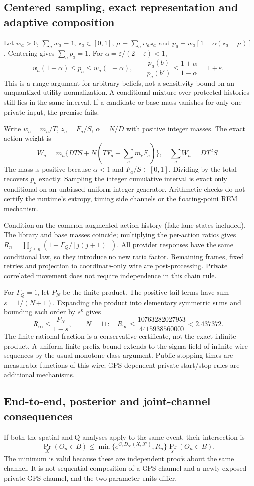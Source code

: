 \subsection{Centered sampling, exact representation and adaptive composition}
Let $w_a>0$, $\sum_aw_a=1$, $z_a\in[0,1]$, $\mu=\sum_aw_az_a$ and
$p_a=w_a[1+\alpha(z_a-\mu)]$. Centering gives
$\sum_ap_a=1$. For $\alpha=\varepsilon/(2+\varepsilon)<1$,
\[
w_a(1-\alpha)\le p_a\le w_a(1+\alpha),\qquad
\frac{p_a(b)}{p_a(b')}\le\frac{1+\alpha}{1-\alpha}=1+\varepsilon .
\]
This is a range argument for arbitrary beliefs, not a sensitivity bound on an
unquantized utility normalization. A conditional mixture over protected histories
still lies in the same interval. If a candidate or base mass vanishes for only
one private input, the premise fails.

Write $w_a=m_a/T$, $z_a=F_a/S$, $\alpha=N/D$ with positive integer masses.
The exact action weight is
\[
W_a=m_a\{DTS+N(TF_a-\sum_cm_cF_c)\},\quad
\sum_aW_a=DT^2S .
\]
The mass is positive because $\alpha<1$ and $F_a/S\in[0,1]$.
Dividing by the total recovers $p_a$ exactly. Sampling the integer cumulative
interval is exact only conditional on an unbiased uniform integer generator.
Arithmetic checks do not certify the runtime's entropy, timing side channels
or the floating-point REM mechanism.

Condition on the common augmented action history (fake lane states included).
The library and base masses coincide; multiplying the per-action ratios gives
$R_n=\prod_{j\le n}(1+\Gamma_Q/[j(j+1)])$. All provider responses have the same
conditional law, so they introduce no new ratio factor. Remaining frames,
fixed retries and projection to coordinate-only wire are post-processing.
Private correlated movement does not require independence in this chain rule.

For $\Gamma_Q=1$, let $P_N$ be the finite product. The positive tail terms
have sum $s=1/(N+1)$. Expanding the product into elementary symmetric sums
and bounding each order by $s^k$ gives
\[
R_\infty\le\frac{P_N}{1-s},\qquad
N=11:\quad R_\infty\le
\frac{10763282027953}{4415938560000}<2.437372.
\]
The finite rational fraction is a conservative certificate, not the exact
infinite product. A uniform finite-prefix bound extends to the sigma-field
of infinite wire sequences by the usual monotone-class argument. Public
stopping times are measurable functions of this wire; GPS-dependent private
start/stop rules are additional mechanisms.

\subsection{End-to-end, posterior and joint-channel consequences}
If both the spatial and Q analyses apply to the same event, their intersection is
\[
\Pr_X(O_n\in B)\le
\min\{e^{C_sD_\infty(X,X')},R_n\}\Pr_{X'}(O_n\in B).
\]
The minimum is valid because these are independent proofs about the same channel.
It is not sequential composition of a GPS channel and a newly exposed private
GPS channel, and the two parameter units differ.

